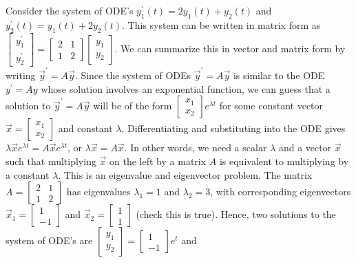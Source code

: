 Consider the system of ODE's $y_1^\prime(t)=2y_1(t)+y_2(t)$ and $y_2^\prime(t) = y_1(t)+2y_2(t)$.  This system can be written in matrix form as 
$
\begin{bmatrix}y_1^\prime\\y_2^\prime\end{bmatrix} 
= 
\begin{bmatrix}2&1\\1&2\end{bmatrix} 
\begin{bmatrix}y_1\\y_2\end{bmatrix}
$. 
We can summarize this in vector and matrix form by writing $\vec y^\prime =A\vec y$. 
Since the system of ODEs $\vec y^\prime =A\vec y$ is similar to the ODE $y^\prime=Ay$ whose solution involves an exponential function, we can guess that a solution to $\vec y^\prime =A\vec y$ will be of the form $\begin{bmatrix}x_1\\x_2\end{bmatrix}e^{\lambda t}$ for some constant vector $\vec x=\begin{bmatrix}x_1\\x_2\end{bmatrix}$ and constant $\lambda$.  
Differentiating and substituting into the ODE gives $\lambda \vec x e^{\lambda t}=A\vec x e^{\lambda t} $, or $\lambda \vec x =A\vec x $. In other words, we need a scalar $\lambda$ and a vector $\vec x$ such that multiplying $\vec x$ on the left by a matrix $A$ is equivalent to multiplying by a constant $\lambda$.  This is an eigenvalue and eigenvector problem. The matrix 
$A=\begin{bmatrix}2&1\\1&2\end{bmatrix}$ has eigenvalues $\lambda_1 = 1$ and $\lambda_2= 3$, with corresponding eigenvectors $\vec x_1=\begin{bmatrix}1\\-1\end{bmatrix}$ and $\vec x_2=\begin{bmatrix}1\\1\end{bmatrix}$ (check this is true). Hence, two solutions to the system of ODE's are 
$ \begin{bmatrix}y_1\\y_2\end{bmatrix} = \begin{bmatrix}1\\-1\end{bmatrix}e^t$ and 
